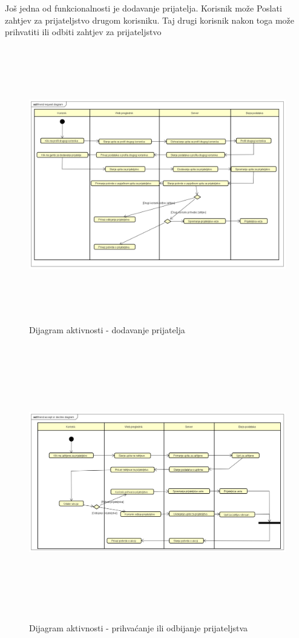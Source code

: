 		 	Još jedna od funkcionalnosti je dodavanje prijatelja. Korisnik može Poslati zahtjev za prijateljstvo drugom korisniku. Taj drugi korisnik nakon toga može prihvatiti ili odbiti zahtjev za prijateljstvo
		 	\begin{figure}[H]
		 	\includegraphics[scale=0.6, height=120mm, width=165mm]{dijagrami/activity/friend request diagram.png} %
		 	\centering
		 	\caption{Dijagram aktivnosti - dodavanje prijatelja}
		 	\label{fig:dijagrami_aktivnosti2}
			 \end{figure}
		 
		 	\begin{figure}[H]
		 	\includegraphics[scale=0.6, height=120mm, width=165mm]{dijagrami/activity/friend accept or decline diagram.png} %
		 	\centering
		 	\caption{Dijagram aktivnosti - prihvaćanje ili odbijanje prijateljstva}
		 	\label{fig:dijagrami_aktivnosti2}
		 	\end{figure}
			\eject
